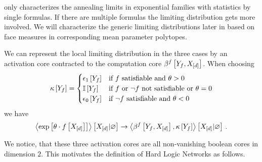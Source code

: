  only characterizes the annealing limits in exponential families with statistics by single formulas.
If there are multiple formulas the limiting distribution gets more involved.
We will characterize the generic limiting distributions later in  based on face measures in corresponding mean parameter polytopes.


We can represent the local limiting distribution in the three cases by an activation core contracted to the computation core $\beta^{f}\left[Y_{f},X_{[d]}\right]$.
When choosing
\begin{align*}
    \kappa\left[Y_{f}\right] =
    \begin{cases}
        \epsilon_1\left[Y_{f}\right] & \text{if $f$ satisfiable and } \theta>0\\
        \mathbb{I}\left[Y_{f}\right] & \text{if $f$ or $\lnot f$ not satisfiable or } \theta=0 \\
        \epsilon_0\left[Y_{f}\right] & \text{if $\lnot f$ satisfiable and } \theta<0\\
    \end{cases}
\end{align*}
we have
\begin{align*}
    \left\langle \mathrm{exp}\left[\theta\cdot f\left[X_{[d]}\right]\right]\right\rangle \left[ X_{[d]} | \varnothing \right] \rightarrow
    \left\langle \beta^{f}\left[Y_{f},X_{[d]}\right],\kappa\left[Y_{f}\right]\right\rangle \left[ X_{[d]} | \varnothing \right] \, .
\end{align*}

We notice, that these three activation cores are all non-vanishing boolean cores in dimension $2$.
This motivates the definition of Hard Logic Networks as follows.

